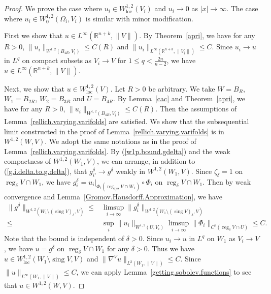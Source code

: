 \documentclass[11pt]{amsart}
\theoremstyle{definition}
\newcommand{\R}{\mathbb{R}}
\newcommand{\loc}{\mathrm{loc}}
\DeclareMathOperator{\sing}{sing}
\DeclareMathOperator{\reg}{reg}
\begin{document}
\begin{proof}We prove the case where $u_i\in W_\loc^{1,2}(V_i)$ and $u_i\to0$ as $|x|\to\infty$. The case where $u_i\in W_0^{1,2}(\Omega_i,V_i)$ is similar with minor modification.

	First we show that $u\in L^\infty(\R^{n+k},\|V\|)$. By Theorem~\ref{apri}, we have for any $R>0$, $\|u_i\|_{W^{1,2}( B_{4R},V_i)}\le C(R)$ and $\|u_i\|_{L^{\infty}(\R^{n+k},\|V_i\|)}\le C$. Since $u_i\to u$ in $L^{q}$ on compact subsets as $V_i\to V$ for $1\le q<\frac{2n}{n-2}$, we have $u\in L^{\infty}(\R^{n+k},\|V\|)$.
    
	
	Next, we show that $u\in W^{1,2}_\loc(V)$. 
	Let $R>0$ be arbitrary. We take $W=B_{R}$, $W_1=B_{2R}$, $W_2=B_{3R}$ and $U=B_{4R}$. By Lemma~\ref{cac} and Theorem~\ref{apri}, we have for any $R>0$, $\|u_i\|_{W^{1,2}( B_{4R},V_i)}\le C(R)$. Then the assumptions of Lemma~\ref{rellich.varying.varifolds} are satisfied. We show that the subsequential limit constructed in the proof of Lemma~\ref{rellich.varying.varifolds} is in $W^{1,2}(W,V)$. We adopt the same notations as in the proof of Lemma~\ref{rellich.varying.varifolds}. By (\ref{w1p.bound.gdelta}) and the weak compactness of $W^{1,2}(W_1,V)$, we can arrange, in addition to (\ref{g.i.delta.to.g.delta}), that $g_{i'}^\delta\to g^\delta$ weakly in $W^{1,2}(W_1,V)$. Since $\zeta_\delta=1$ on $\reg_\delta V\cap W_1$, we have $g_i^\delta=u_i|_{\Phi_i(\reg_{\delta/2} V\cap W_1)}\circ \Phi_i$ on $\reg_\delta V\cap W_1$. Then by weak convergence and Lemma~\ref{Gromov.Hausdorff.Approximation}, we have 
	\[\begin{aligned}
		\|g^\delta\|_{W^{1,2}(W_1\setminus (\sing V)_\delta,V)}\le& \limsup_{i\to\infty}\|g_i^\delta\|_{W^{1,2}(W_1\setminus (\sing V)_\delta,V)}\\
		\le& \sup_i\|u_i\|_{W^{1,2}(U,V_i)}\limsup_{i\to\infty}\|\Phi_i\|_{C^2(\reg_\delta V\cap U)}\le C.
	\end{aligned}\] 
	Note that the bound is independent of $\delta>0$.  Since $u_i\to u$ in $L^{q}$ on $W_1$ as $V_i\to V$, we have $ u=g^\delta$ on $\reg_\delta V\cap W_1$ for any $\delta>0$. Thus we have $u\in W^{1,2}_\loc(W_1\setminus\sing V,V)$ and $\|\nabla^Vu\|_{L^2(W_1,\|V\|)}\le C$. Since  $\|u\|_{L^{\infty}(W_1,\|V\|)}\le C$, we can apply Lemma~\ref{getting.sobolev.functions} to see that $u\in W^{1,2}(W,V)$. 
	

\end{proof}
\end{document}
